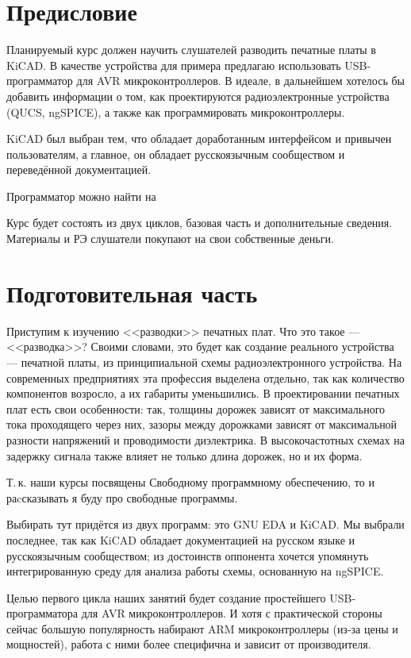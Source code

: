 \section{Предисловие}\label{kicad:introduction:pre}
Планируемый курс должен научить слушателей разводить печатные платы в KiCAD. В качестве устройства для примера предлагаю использовать USB-программатор для AVR микроконтроллеров. В идеале, в дальнейшем хотелось бы добавить информации о том, как проектируются радиоэлектронные устройства (QUCS, ngSPICE), а также как программировать микроконтроллеры.

KiCAD был выбран тем, что обладает доработанным интерфейсом и привычен пользователям, а главное, он обладает русскоязычным сообществом и переведённой документацией.

Программатор можно найти на 

Курс будет состоять из двух циклов, базовая часть и дополнительные сведения. Материалы и РЭ слушатели покупают на свои собственные деньги. 

\section{Подготовительная часть} 
Приступим к изучению <<разводки>> печатных плат. Что это такое --- <<разводка>>? Своими словами, это будет как создание реального устройства --- печатной платы, из принципиальной схемы радиоэлектронного устройства. 
На современных предприятиях эта профессия выделена отдельно, так как количество компонентов возросло, а их габариты уменьшились.
В проектировании печатных плат есть свои особенности: так, толщины дорожек зависят от максимального тока проходящего через них, зазоры между дорожками зависят от максимальной разности напряжений и проводимости диэлектрика. В высокочастотных схемах на задержку сигнала также влияет не только длина дорожек, но и их форма.

Т.\,к. наши курсы посвящены Свободному программному обеспечению, то и раcсказывать я буду про свободные программы.

Выбирать тут придётся из двух программ: это GNU EDA и KiCAD. Мы выбрали последнее, так как KiCAD  обладает документацией на русском языке и русскоязычным сообществом; из достоинств оппонента хочется упомянуть интегрированную среду для анализа работы схемы, основанную на ngSPICE. 

Целью первого цикла наших занятий будет создание простейшего USB-программатора для AVR микроконтроллеров. И хотя с практической стороны сейчас большую популярность набирают ARM микроконтроллеры (из-за цены и мощностей), работа с ними более специфична и зависит от производителя.

